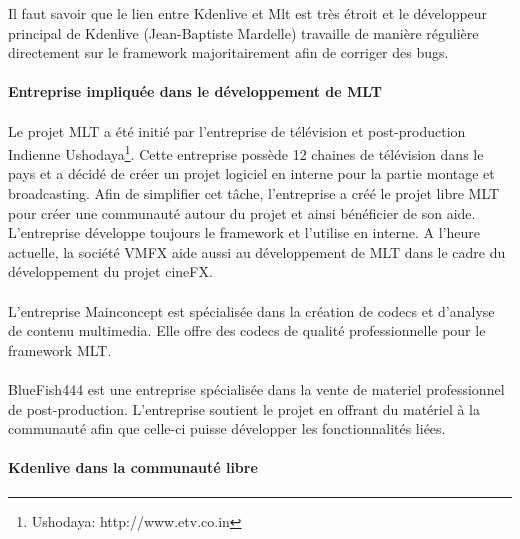 Il faut savoir que le lien entre Kdenlive et Mlt est très étroit et le
développeur principal de Kdenlive (Jean-Baptiste Mardelle) travaille
de manière régulière directement sur le framework majoritairement
afin de corriger des bugs.

\paragraph{Entreprise impliquée dans le développement de MLT}

\paragraph{}

Le projet MLT a été initié par l'entreprise de
télévision et post-production Indienne Ushodaya\footnote{Ushodaya:
http://www.etv.co.in}. Cette entreprise possède 12 chaines de
télévision dans le pays et a décidé de créer un projet logiciel
en interne pour la partie montage et broadcasting. Afin de simplifier
cet tâche, l'entreprise a créé le projet libre MLT pour
créer une communauté autour du projet et ainsi bénéficier de son
aide. L'entreprise développe toujours le framework et l'utilise
en interne. A l'heure actuelle, la société VMFX aide aussi au
développement de MLT dans le cadre du développement du projet cineFX.

\paragraph{}

L'entreprise Mainconcept est spécialisée dans la création de codecs
et d'analyse de contenu multimedia. Elle offre des codecs de qualité
professionnelle pour le framework MLT.

\paragraph{}

BlueFish444 est une entreprise spécialisée dans la vente de materiel
professionnel de post-production. L'entreprise soutient le projet
en offrant du matériel  à la communauté afin que celle-ci puisse
développer les fonctionnalités liées.

\paragraph{Kdenlive dans la communauté libre}


